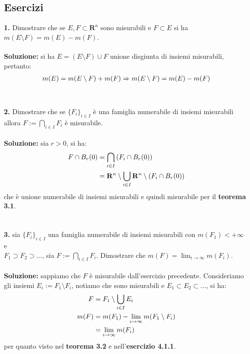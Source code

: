 \documentclass{article}
\begin{document}
\subsection{Esercizi}
\textbf{1.} Dimostrare che se $E, F \subset \mathbf{R}^n$ sono misurabili e $F \subset E$ si ha $m(E \setminus F) = m(E) - m(F)$. \\ \\
\textbf{Soluzione:} si ha $E = (E \setminus F) \cup F$ unione disgiunta di insiemi misurabili, pertanto:
\begin{gather}
    m(E) = m(E \setminus F) + m(F) \Rightarrow m(E \setminus F) = m(E) - m(F) \notag
\end{gather}
\\ \\
\textbf{2.} Dimostrare che se $\{ F_i \}_{i \in I}$ è una famiglia numerabile di insiemi misurabili allora $F := \bigcap_{i \in I} F_i$ è misurabile. \\ \\
\textbf{Soluzione:} sia $r > 0$, si ha:
\begin{align}
    F \cap B_r(0) &= \bigcap_{i \in I} \left(F_i \cap B_r(0) \right) \notag \\
    &= \mathbf{R}^n \setminus \bigcup_{i \in I} \mathbf{R}^n \setminus (F_i \cap B_r(0)) \notag
\end{align}
che è unione numerabile di insiemi misurabili e quindi misurabile per il \textbf{teorema 3.1}. \\ \\ \\
\textbf{3.} sia $\{ F_i \}_{i \in I}$ una famiglia numerabile di insiemi misurabili con $m(F_1) < + \infty$ e \\ $F_1 \supset F_2 \supset \dots$, sia $F := \bigcap_{i \in I} F_i$. Dimostrare che $m(F) = \lim_{i \rightarrow \infty} m(F_i)$. \\ \\
\textbf{Soluzione:} sappiamo che $F$ è misurabile dall'esercizio precedente. Consideriamo gli insiemi $E_i := F_1 \setminus F_i$, notiamo che sono misurabili e $E_1 \subset E_2 \subset \dots$, si ha:
\begin{align}
    F &= F_1 \setminus \bigcup_{i \in I} E_i \notag \\
    m(F) &= m(F_1) - \lim_{i \rightarrow \infty} m(F_1 \setminus F_i) \notag \\
    &= \lim_{i \rightarrow \infty} m(F_i) \notag
\end{align}
per quanto visto nel \textbf{teorema 3.2} e nell'\textbf{esercizio 4.1.1}. \newpage
\end{document}
